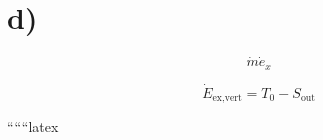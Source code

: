 

\section*{d)}

\[
\dot{m} \dot{e}_x
\]

\[
\dot{E}_{\text{ex,vert}} = T_0 - S_{\text{out}}
\]

``````latex